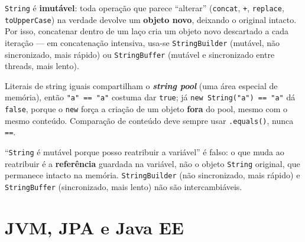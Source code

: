 \begin{conceito}
\texttt{String} é \textbf{imutável}: toda operação que parece “alterar”
(\texttt{concat}, \texttt{+}, \texttt{replace}, \texttt{toUpperCase})
na verdade devolve um \textbf{objeto novo}, deixando o original intacto.
Por isso, concatenar dentro de um laço cria um objeto novo descartado a
cada iteração --- em concatenação intensiva, usa-se
\texttt{StringBuilder} (mutável, não sincronizado, mais rápido) ou
\texttt{StringBuffer} (mutável e sincronizado entre threads, mais lento).

Literais de string iguais compartilham o \textbf{\textit{string pool}}
(uma área especial de memória), então \texttt{"a" == "a"} costuma dar
\texttt{true}; já \texttt{new String("a") == "a"} dá \texttt{false},
porque o \texttt{new} força a criação de um objeto \textbf{fora} do pool,
mesmo com o mesmo conteúdo. Comparação de conteúdo deve sempre usar
\texttt{.equals()}, nunca \texttt{==}.
\end{conceito}

\begin{cuidado}
“\texttt{String} é mutável porque posso reatribuir a variável” é falso:
o que muda ao reatribuir é a \textbf{referência} guardada na variável, não
o objeto \texttt{String} original, que permanece intacto na memória.
\texttt{StringBuilder} (não sincronizado, mais rápido) e
\texttt{StringBuffer} (sincronizado, mais lento) não são intercambiáveis.
\end{cuidado}

\section{JVM, JPA e Java EE}

